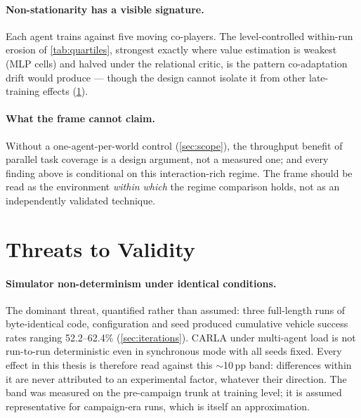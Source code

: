 \paragraph{Non-stationarity has a visible signature.}
Each agent trains against five moving co-players. The level-controlled
within-run erosion of \cref{tab:quartiles}, strongest exactly where
value estimation is weakest (MLP cells) and halved under the
relational critic, is the pattern co-adaptation drift would produce ---
though the design cannot isolate it from other late-training effects
(\cref{sec:threats}).

\paragraph{What the frame cannot claim.}
Without a one-agent-per-world control (\cref{sec:scope}), the
throughput benefit of parallel task coverage is a design argument, not a
measured one; and every finding above is conditional on this
interaction-rich regime. The frame should be read as the environment
\emph{within which} the regime comparison holds, not as an
independently validated technique.

\section{Threats to Validity}
\label{sec:threats}

\paragraph{Simulator non-determinism under identical conditions.}
The dominant threat, quantified rather than assumed: three full-length
runs of byte-identical code, configuration and seed produced cumulative
vehicle success rates ranging 52.2--62.4\% (\cref{sec:iterations}).
CARLA under multi-agent load is not run-to-run deterministic even in
synchronous mode with all seeds fixed. Every effect in this thesis is
therefore read against this $\sim$10\,pp band: differences within it are
never attributed to an experimental factor, whatever their direction. The
band was measured on the pre-campaign trunk at training level; it is
assumed representative for campaign-era runs, which is itself an
approximation.

